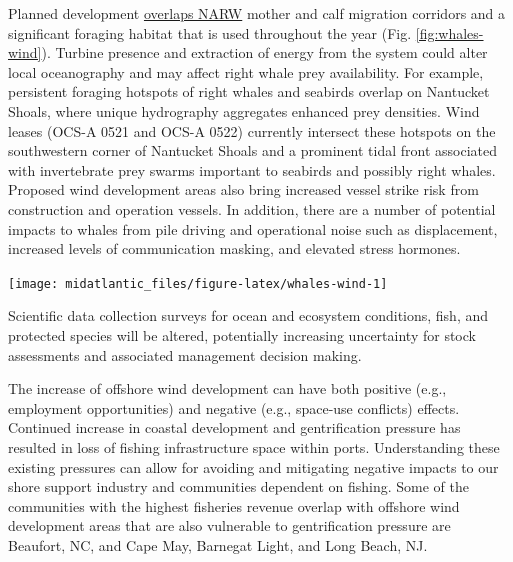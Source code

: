 \documentclass[
  10pt,
]{article}
\let\origfigure\figure
\let\endorigfigure\endfigure
\renewenvironment{figure}[1][2] {
    \expandafter\origfigure\expandafter[H]
} {
    \endorigfigure
}
\begin{document}
Planned development \href{https://noaa-edab.github.io/catalog/persistent_hotspots.html}{overlaps NARW} mother and calf migration corridors and a significant foraging habitat that is used throughout the year (Fig. \ref{fig:whales-wind}). Turbine presence and extraction of energy from the system could alter local oceanography and may affect right whale prey availability. For example, persistent foraging hotspots of right whales and seabirds overlap on Nantucket Shoals, where unique hydrography aggregates enhanced prey densities. Wind leases (OCS-A 0521 and OCS-A 0522) currently intersect these hotspots on the southwestern corner of Nantucket Shoals and a prominent tidal front associated with invertebrate prey swarms important to seabirds and possibly right whales. Proposed wind development areas also bring increased vessel strike risk from construction and operation vessels. In addition, there are a number of potential impacts to whales from pile driving and operational noise such as displacement, increased levels of communication masking, and elevated stress hormones.

\begin{figure}

{\centering \texttt{[image: midatlantic\_files/figure-latex/whales-wind-1]} 

}

\caption{Northern Right Whale persistent hotspots (red shading) and Wind Energy Areas (black outlines).}\label{fig:whales-wind}
\end{figure}

Scientific data collection surveys for ocean and ecosystem conditions, fish, and protected species will be altered, potentially increasing uncertainty for stock assessments and associated management decision making.

The increase of offshore wind development can have both positive (e.g., employment opportunities) and negative (e.g., space-use conflicts) effects. Continued increase in coastal development and gentrification pressure has resulted in loss of fishing infrastructure space within ports. Understanding these existing pressures can allow for avoiding and mitigating negative impacts to our shore support industry and communities dependent on fishing. Some of the communities with the highest fisheries revenue overlap with offshore wind development areas that are also vulnerable to gentrification pressure are Beaufort, NC, and Cape May, Barnegat Light, and Long Beach, NJ.

\newpage
\end{document}
